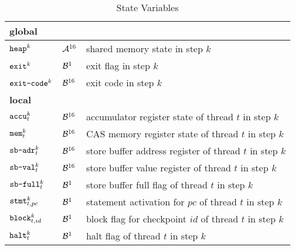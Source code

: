 \renewcommand{\arraystretch}{1.25}
\begin{table}[h!]
\begin{tabular}{lll}
  \hline
  \textbf{global} &&\\
  \hline
  $\HEAP^k$ & $\ASORT$ & shared memory state in step $k$ \\
  $\EXIT^k$ & $\BVSORT[1]$ & exit flag in step $k$ \\
  $\EXITCODE^k$ & $\BVSORT$ & exit code in step $k$ \\
  \hline
  \textbf{local} &&\\
  \hline
  $\ACCU^k_t$ & $\BVSORT$ & accumulator register state of thread $t$ in step $k$ \\
  $\MEM^k_t$ & $\BVSORT$ & CAS memory register state of thread $t$ in step $k$ \\
  $\SBADR^k_t$ & $\BVSORT$ & store buffer address register of thread $t$ in step $k$ \\
  $\SBVAL^k_t$ & $\BVSORT$ & store buffer value register of thread $t$ in step $k$ \\
  $\SBFULL^k_t$ & $\BVSORT[1]$ & store buffer full flag of thread $t$ in step $k$ \\
  $\STMT^k_{t, pc}$ & $\BVSORT[1]$ & statement activation for $pc$ of thread $t$ in step $k$ \\
  $\BLOCK^k_{t, id}$ & $\BVSORT[1]$ & block flag for checkpoint $id$ of thread $t$ in step $k$ \\
  $\HALT^k_t$ & $\BVSORT[1]$ & halt flag of thread $t$ in step $k$ \\
  \hline
\end{tabular}
\caption{State Variables}
\end{table}


